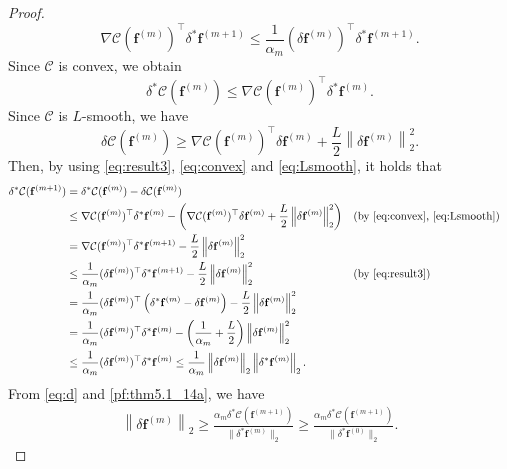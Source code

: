 \documentclass[onefignum,onetabnum]{siamonline220329}
\numberwithin{equation}{section}
\def\f{\mathbf{f}}
\begin{document}
\begin{sloppypar}
\begin{proof}
\begin{equation} \label{eq:result3}
\nabla\mathcal{C}(\f^{(m)})^\top \delta^*\f^{(m+1)} \leq \frac{1}{\alpha_m} (\delta\f^{(m)})^\top\delta^*\f^{(m+1)}.
\end{equation}
Since $\mathcal{C}$ is convex, we obtain
\begin{equation} \label{eq:convex}
\delta^*\mathcal{C}(\f^{(m)}) \leq \nabla\mathcal{C}(\f^{(m)}) ^\top \delta^*\f^{(m)}. 
\end{equation}
Since $\mathcal{C}$ is $L$-smooth, we have
\begin{equation} \label{eq:Lsmooth}
\delta\mathcal{C}(\f^{(m)}) \geq \nabla\mathcal{C}(\f^{(m)})^\top \delta\f^{(m)} + \frac{L}{2} \left\| \delta\f^{(m)} \right\|_2^2.
\end{equation}
Then, by using \eqref{eq:result3}, \eqref{eq:convex} and \eqref{eq:Lsmooth}, it holds that
\begin{align}
\delta^*\mathcal{C}(\f^{(m+1)})
&= \delta^*\mathcal{C}(\f^{(m)}) -\delta\mathcal{C}(\f^{(m)}) \nonumber \\
&\leq \nabla\mathcal{C}(\f^{(m)})^\top \delta^*\f^{(m)} - \left( \nabla\mathcal{C}(\f^{(m)})^\top \delta\f^{(m)} + \frac{L}{2} \left\| \delta\f^{(m)} \right\|_2^2 \right) &&\text{(by \eqref{eq:convex}, \eqref{eq:Lsmooth})} \nonumber \\
&= \nabla\mathcal{C}(\f^{(m)})^\top \delta^*\f^{(m+1)} - \frac{L}{2} \left\| \delta\f^{(m)} \right\|_2^2 \nonumber \\
&\leq \frac{1}{\alpha_m} (\delta\f^{(m)})^\top \delta^*\f^{(m+1)} - \frac{L}{2} \left\| \delta\f^{(m)} \right\|_2^2 && \text{(by \eqref{eq:result3})} \nonumber \\
&= \frac{1}{\alpha_m} (\delta\f^{(m)})^\top \left( \delta^*\f^{(m)} -\delta\f^{(m)} \right) - \frac{L}{2} \left\| \delta\f^{(m)} \right\|_2^2 \nonumber \\
&= \frac{1}{\alpha_m} (\delta\f^{(m)})^\top \delta^*\f^{(m)} - \left(\frac{1}{\alpha_m} + \frac{L}{2}\right) \left\| \delta\f^{(m)} \right\|_2^2 \nonumber \\
& \leq \frac{1}{\alpha_m} (\delta\f^{(m)})^\top \delta^*\f^{(m)} 
\leq \frac{1}{\alpha_m} \left\| \delta\f^{(m)} \right\|_2  \left\| \delta^*\f^{(m)} \right\|_2. \label{pf:thm5.1_14a}
\end{align}
From \eqref{eq:d} and \eqref{pf:thm5.1_14a}, we have
\begin{align}
\left\| \delta\f^{(m)} \right\|_2 \geq \frac{\alpha_m \delta^*\mathcal{C}(\f^{(m+1)})}{\| \delta^*\f^{(m)} \|_2} \geq \frac{\alpha_m \delta^*\mathcal{C}(\f^{(m+1)})}{\| \delta^*\f^{(0)} \|_2}. \label{pf:thm5.1_14b}

\end{align}
\end{proof}
\end{sloppypar}
\end{document}
